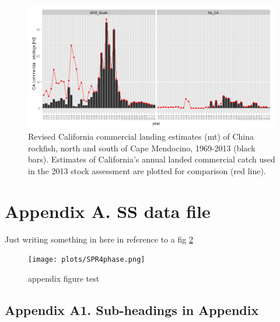 \documentclass[12pt,]{article}
\begin{document}
\begin{figure}[htbp]
\centering
\includegraphics{plots/EJD_China_comm_lands_by_year-region-compare2013.png}
\caption{Revised California commercial landing estimates (mt) of China
rockfish, north and south of Cape Mendocino, 1969-2013 (black bars).
Estimates of California's annual landed commercial catch used in the
2013 stock assessment are plotted for comparison (red line).
\label{EJD_CALCOM_3}}
\end{figure}

\newpage

\section*{Appendix A. SS data file}\label{appendix-a.-ss-data-file}

\renewcommand{\thepage}{A-\arabic{page}}
\renewcommand{\thefigure}{A\arabic{figure}}
\renewcommand{\thetable}{A\arabic{table}}

\setcounter{page}{1} \setcounter{figure}{1} \setcounter{table}{1}

Just writing something in here in reference to a fig \ref{appendfig}

\begin{figure}[htbp]
\centering
\texttt{[image: plots/SPR4phase.png]}
\caption{appendix figure test \label{appendfig}}
\end{figure}

\newpage 

\subsection*{Appendix A1. Sub-headings in
Appendix}\label{appendix-a1.-sub-headings-in-appendix}
\end{document}
